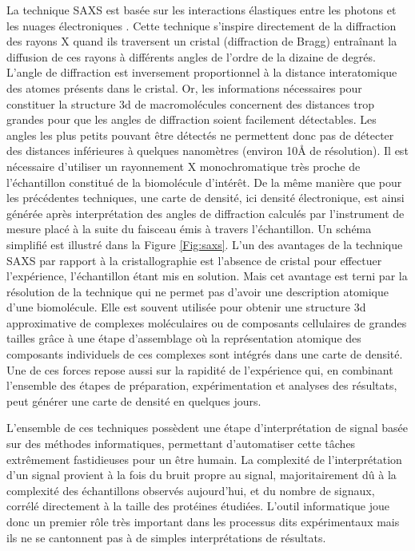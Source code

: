 La technique SAXS est basée sur les interactions élastiques entre les photons et les nuages électroniques \cite{guimer1955small}. Cette technique s'inspire directement de la diffraction des rayons X quand ils traversent un cristal (diffraction de Bragg) entraînant la diffusion de ces rayons à différents angles de l'ordre de la dizaine de degrés. L'angle de diffraction est inversement proportionnel à la distance interatomique des atomes présents dans le cristal. Or, les informations nécessaires pour constituer la structure 3d de macromolécules concernent des distances trop grandes pour que les angles de diffraction soient facilement détectables. Les angles les plus petits pouvant être détectés ne permettent donc pas de détecter des distances inférieures à quelques nanomètres (environ 10\r{A} de résolution). Il est nécessaire d'utiliser un rayonnement X monochromatique très proche de l'échantillon constitué de la biomolécule d'intérêt. De la même manière que pour les précédentes techniques, une carte de densité, ici densité électronique, est ainsi générée après interprétation des angles de diffraction calculés par l'instrument de mesure placé à la suite du faisceau émis à travers l'échantillon. Un schéma simplifié est illustré dans la Figure \ref{Fig:saxs}.
L'un des avantages de la technique SAXS par rapport à la cristallographie est l'absence de cristal pour effectuer l'expérience, l'échantillon étant mis en solution. Mais cet avantage est terni par la résolution de la technique qui ne permet pas d'avoir une description atomique d'une biomolécule. Elle est souvent utilisée pour obtenir une structure 3d approximative de complexes moléculaires ou de composants cellulaires de grandes tailles grâce à une étape d'assemblage où la représentation atomique des composants individuels de ces complexes sont intégrés dans une carte de densité. Une de ces forces repose aussi sur la rapidité de l'expérience qui, en combinant l'ensemble des étapes de préparation, expérimentation et analyses des résultats, peut générer une carte de densité en quelques jours.

L'ensemble de ces techniques possèdent une étape d'interprétation de signal basée sur des méthodes informatiques, permettant d'automatiser cette tâches extrêmement fastidieuses pour un être humain. La complexité de l'interprétation d'un signal provient à la fois du bruit propre au signal, majoritairement dû à la complexité des échantillons observés aujourd'hui, et du nombre de signaux, corrélé directement à la taille des protéines étudiées. L'outil informatique joue donc un premier rôle très important dans les processus dits expérimentaux mais ils ne se cantonnent pas à de simples interprétations de résultats.

